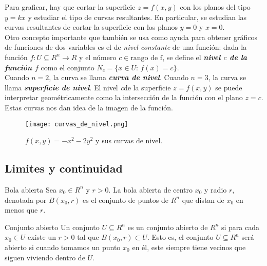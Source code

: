 \documentclass[a4paper, twoside]{article}
\numberwithin{equation}{section}
\numberwithin{figure}{section}
\numberwithin{table}{section}
\begin{document}
\begin{minipage}{0.6\textwidth}
	Para graficar, hay que cortar la superficie $z=f(x,y)$ con los planos del tipo $y=kx$ y estudiar el tipo de curvas resultantes.
	En particular, se estudian las curvas resultantes de cortar la superficie con los planos $y=0$ y $x=0$.\\
	
	Otro concepto importante que también se usa como ayuda para obtener gráficos de funciones de dos variables es el de \emph{nivel constante} de una función: dada la función $f:U\subseteq R^n \rightarrow R$ y el número $c\in\mbox{rango de f}$, se define el \emph{\textbf{nivel $c$ de la función $f$}} como el conjunto $N_{c} = \{ x \in U:\, f \left( x \right) = c\}.$\\
	
	Cuando $n=2$, la curva se llama \textit{\textbf{curva de nivel}}. 
	Cuando $n=3$, la curva se llama \textit{\textbf{superficie de nivel}}. 
	El nivel \textit{c}de la superficie $z=f\left(x,y\right)$ se puede interpretar geométricamente como la intersección de la función con el plano $z=c$.
	Estas curvas nos dan idea de la imagen de la función.
\end{minipage}
\begin{minipage}{0.3\textwidth}
	\begin{figure}[H]
		\centering
		\texttt{[image: curvas\_de\_nivel.png]}
		\caption{$f(x,y)=-x^2-2y^2$ y sus curvas de nivel.}
	\end{figure}
\end{minipage}

\subsection{Limites y continuidad}
\begin{definicion*}{Bola abierta}
	Sea $x_0\in R^n$ y $r>0$.
	La bola abierta de centro $x_0$ y radio $r$, denotada por $B\left(x_0,r\right)$ es el conjunto de puntos de $R^n$ que distan de $x_0$ en menos que $r$.
\end{definicion*}

\begin{definicion*}{Conjunto abierto}
	Un conjunto $U\subseteq R^n$ es un conjunto abierto de $R^n$ si para cada $x_0\in U$ existe un $r>0$ tal que $B\left(x_0,r\right)\subset U$.
	Esto es, el conjunto $U\subseteq R^n$ será abierto si cuando tomamos un punto $x_0$ en él, este siempre tiene vecinos que siguen viviendo dentro de $U$.\\
\end{definicion*}
\end{document}
